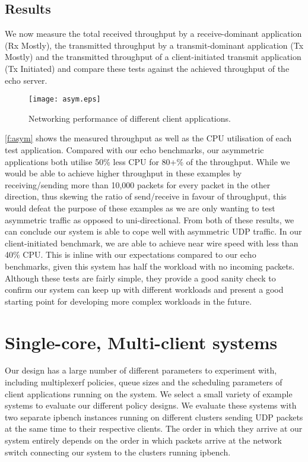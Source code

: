 \subsection{Results}
We now measure the total received throughput by a receive-dominant application (Rx Mostly), the
transmitted throughput by a transmit-dominant application (Tx Mostly) and the transmitted throughput
of a client-initiated transmit application (Tx Initiated) and compare these tests against the achieved
throughput of the echo server. 

\vspace{0.5cm}
\begin{figure}[h]
    \centering
    \texttt{[image: asym.eps]}
    \caption{Networking performance of different client applications.}
    \label{f:asym}
\end{figure}

\autoref{f:asym} shows the measured throughput as well as the CPU utilisation of each test application. 
Compared with our echo benchmarks, our asymmetric applications both utilise 50\% less CPU for 80+\% of the
throughput. While we would be able to achieve higher throughput in these examples by receiving/sending
more than 10,000 packets for every packet in the other direction, thus skewing the ratio of send/receive in favour of throughput,
this would defeat the purpose of these examples
as we are only wanting to test asymmetric traffic as opposed to uni-directional.
From both of these results, we can conclude our system is able to cope well with asymmetric UDP traffic. 
In our client-initiated benchmark, we are able to achieve near wire speed with less than 40\% CPU. This is inline
with our expectations compared to our echo benchmarks, given this system has half the workload with no incoming
packets. Although these tests are fairly simple, they provide a good sanity check to confirm our system can 
keep up with different workloads and present a good starting point for developing more complex workloads in the future.

\section{Single-core, Multi-client systems}

Our design has a large number of different parameters to experiment with, including multiplexerƒ
policies, queue sizes and the scheduling parameters of client applications running on the system. 
We select a small variety of example systems to evaluate our different policy designs. We evaluate
these systems with two separate ipbench instances running on different clusters sending UDP packets
at the same time to their respective clients. The order in which they arrive at our system entirely
depends on the order in which packets arrive at the network switch connecting our system to the clusters
running ipbench. 

